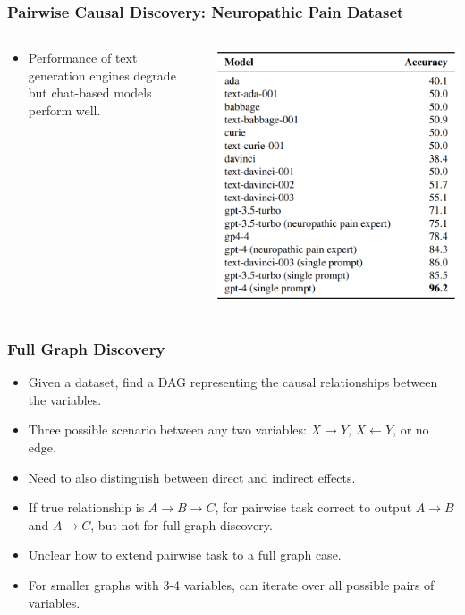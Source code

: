 \documentclass{beamer}
\begin{document}
\begin{frame}
	\frametitle{Pairwise Causal Discovery: Neuropathic Pain Dataset}
	\begin{columns}
		\begin{column}{0.5 \textwidth}
			\begin{itemize}
				\item Performance of text generation engines degrade but chat-based models perform well.
			\end{itemize}
		\end{column}
		\begin{column}{0.5 \textwidth}
			\includegraphics[scale=0.2]{imgs/table4.png}
		\end{column}
	\end{columns}
\end{frame}

\begin{frame}
	\frametitle{Full Graph Discovery}
	\begin{itemize}
		\item Given a dataset, find a DAG representing the causal relationships between the variables.
		\item Three possible scenario between any two variables: $ X \rightarrow Y $, $ X \leftarrow Y $, or no edge.
		\item Need to also distinguish between direct and indirect effects.
		\item If true relationship is $ A \rightarrow B \rightarrow C $, for pairwise task correct to output $ A \rightarrow B $
			and $ A \rightarrow C $, but not for full graph discovery.
		\item Unclear how to extend pairwise task to a full graph case.
		\item For smaller graphs with 3-4 variables, can iterate over all possible pairs of variables.
	\end{itemize}
\end{frame}
\end{document}
